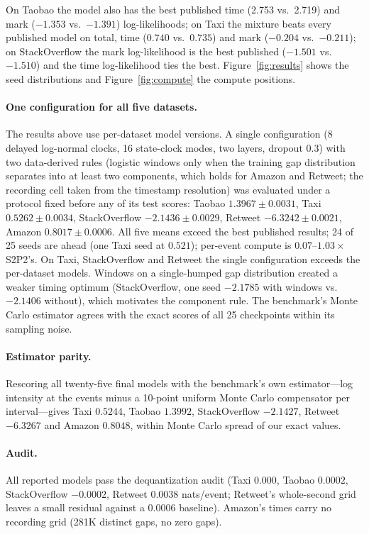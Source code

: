 \documentclass[11pt]{article}
\begin{document}
On Taobao the model also has the best published time (2.753 vs.\ 2.719) and mark ($-1.353$ vs.\ $-1.391$) log-likelihoods; on Taxi the mixture beats every published model on total, time ($0.740$ vs.\ $0.735$) and mark ($-0.204$ vs.\ $-0.211$); on StackOverflow the mark log-likelihood is the best published ($-1.501$ vs.\ $-1.510$) and the time log-likelihood ties the best. Figure~\ref{fig:results} shows the seed distributions and Figure~\ref{fig:compute} the compute positions.

\paragraph{One configuration for all five datasets.} The results above use per-dataset model versions. A single configuration (8 delayed log-normal clocks, 16 state-clock modes, two layers, dropout 0.3) with two data-derived rules (logistic windows only when the training gap distribution separates into at least two components, which holds for Amazon and Retweet; the recording cell taken from the timestamp resolution) was evaluated under a protocol fixed before any of its test scores: Taobao $1.3967\pm0.0031$, Taxi $0.5262\pm0.0034$, StackOverflow $-2.1436\pm0.0029$, Retweet $-6.3242\pm0.0021$, Amazon $0.8017\pm0.0006$. All five means exceed the best published results; 24 of 25 seeds are ahead (one Taxi seed at $0.521$); per-event compute is $0.07$--$1.03\times$ S2P2's. On Taxi, StackOverflow and Retweet the single configuration exceeds the per-dataset models. Windows on a single-humped gap distribution created a weaker timing optimum (StackOverflow, one seed $-2.1785$ with windows vs.\ $-2.1406$ without), which motivates the component rule. The benchmark's Monte Carlo estimator agrees with the exact scores of all 25 checkpoints within its sampling noise.

\paragraph{Estimator parity.} Rescoring all twenty-five final models with the benchmark's own estimator---log intensity at the events minus a 10-point uniform Monte Carlo compensator per interval---gives Taxi $0.5244$, Taobao $1.3992$, StackOverflow $-2.1427$, Retweet $-6.3267$ and Amazon $0.8048$, within Monte Carlo spread of our exact values.

\paragraph{Audit.} All reported models pass the dequantization audit (Taxi $0.000$, Taobao $0.0002$, StackOverflow $-0.0002$, Retweet $0.0038$ nats/event; Retweet's whole-second grid leaves a small residual against a $0.0006$ baseline). Amazon's times carry no recording grid (281K distinct gaps, no zero gaps).
\end{document}
